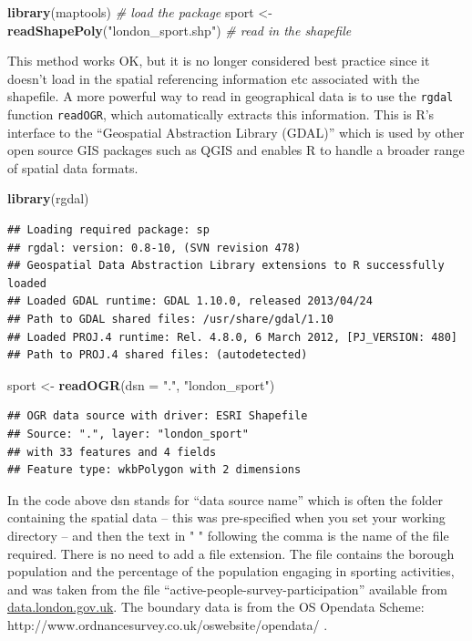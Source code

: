 \documentclass[]{article}
\newenvironment{Shaded}{}{}
\newcommand{\KeywordTok}[1]{\textcolor[rgb]{0.00,0.44,0.13}{\textbf{{#1}}}}
\newcommand{\DataTypeTok}[1]{\textcolor[rgb]{0.56,0.13,0.00}{{#1}}}
\newcommand{\StringTok}[1]{\textcolor[rgb]{0.25,0.44,0.63}{{#1}}}
\newcommand{\CommentTok}[1]{\textcolor[rgb]{0.38,0.63,0.69}{\textit{{#1}}}}
\newcommand{\NormalTok}[1]{{#1}}
\begin{document}
\begin{Shaded}
\begin{Highlighting}[]
\KeywordTok{library}\NormalTok{(maptools)  }\CommentTok{# load the package}
\NormalTok{sport <- }\KeywordTok{readShapePoly}\NormalTok{(}\StringTok{"london_sport.shp"}\NormalTok{)  }\CommentTok{# read in the shapefile}
\end{Highlighting}
\end{Shaded}
This method works OK, but it is no longer considered best practice since
it doesn't load in the spatial referencing information etc associated
with the shapefile. A more powerful way to read in geographical data is
to use the \texttt{rgdal} function \texttt{readOGR}, which automatically
extracts this information. This is R's interface to the ``Geospatial
Abstraction Library (GDAL)'' which is used by other open source GIS
packages such as QGIS and enables R to handle a broader range of spatial
data formats.

\begin{Shaded}
\begin{Highlighting}[]
\KeywordTok{library}\NormalTok{(rgdal)}
\end{Highlighting}
\end{Shaded}
\begin{verbatim}
## Loading required package: sp
## rgdal: version: 0.8-10, (SVN revision 478)
## Geospatial Data Abstraction Library extensions to R successfully loaded
## Loaded GDAL runtime: GDAL 1.10.0, released 2013/04/24
## Path to GDAL shared files: /usr/share/gdal/1.10
## Loaded PROJ.4 runtime: Rel. 4.8.0, 6 March 2012, [PJ_VERSION: 480]
## Path to PROJ.4 shared files: (autodetected)
\end{verbatim}
\begin{Shaded}
\begin{Highlighting}[]
\NormalTok{sport <- }\KeywordTok{readOGR}\NormalTok{(}\DataTypeTok{dsn =} \StringTok{"."}\NormalTok{, }\StringTok{"london_sport"}\NormalTok{)}
\end{Highlighting}
\end{Shaded}
\begin{verbatim}
## OGR data source with driver: ESRI Shapefile 
## Source: ".", layer: "london_sport"
## with 33 features and 4 fields
## Feature type: wkbPolygon with 2 dimensions
\end{verbatim}
In the code above dsn stands for ``data source name'' which is often the
folder containing the spatial data -- this was pre-specified when you
set your working directory -- and then the text in " " following the
comma is the name of the file required. There is no need to add a file
extension. The file contains the borough population and the percentage
of the population engaging in sporting activities, and was taken from
the file ``active-people-survey-participation'' available from
\href{http://data.london.gov.uk/datastore/package/active-people-survey-participation}{data.london.gov.uk}.
The boundary data is from the OS Opendata Scheme:
http://www.ordnancesurvey.co.uk/oswebsite/opendata/ .
\end{document}

